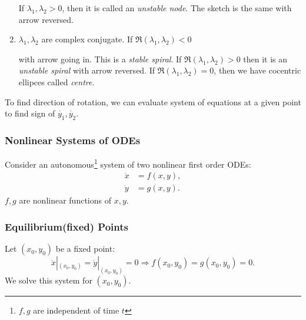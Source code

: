 \documentclass[a4paper]{article}
\begin{document}
\begin{enumerate}
\begin{center}
          \end{center}
          If $ \lambda_1,\lambda_2>0 $, then it is called an \textit{unstable node}. The sketch is the same with arrow reversed.
          \item $ \lambda_1,\lambda_2 $ are complex conjugate. If $ \Re(\lambda_1,\lambda_2)<0 $
          \begin{center}
          \end{center}
          with arrow going in. This is a \textit{stable spiral}. If $ \Re(\lambda_1,\lambda_2)>0 $ then it is an \textit{unstable spiral} with arrow reversed. If $ \Re(\lambda_1,\lambda_2)=0 $, then we have cocentric ellipces called \textit{centre}. 
    \end{enumerate}
    \begin{remark}
        To find direction of rotation, we can evaluate system of equations at a given point to find sign of $ \dot{y_1},\dot{y_2} $.
    \end{remark}
    \subsubsection{Nonlinear Systems of ODEs}
    Consider an autonomous\footnote{$f,g$ are independent of time $t$} system of two nonlinear first order ODEs:
    \begin{align*}
        \dot{x}&= f(x,y),\\
        \dot{y}&= g(x,y).
    \end{align*}
    $f,g$ are nonlinear functions of $x,y$.
    \subsubsection*{Equilibrium(fixed) Points}
    Let $ (x_0,y_0) $ be a fixed point:
    \[
        \dot{x}|_{(x_0,y_0)} = \dot{y}|_{(x_0,y_0)}=0 \Rightarrow f(x_0,y_0)=g(x_0,y_0)=0.
    \]
    We solve this system for $(x_0,y_0)$.
\end{document}

